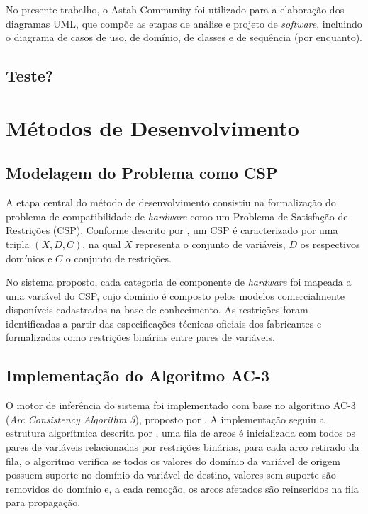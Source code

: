 No presente trabalho, o Astah Community foi utilizado para a elaboração dos diagramas UML, que compõe as etapas de análise
e projeto de \textit{software}, incluindo o diagrama de casos de uso, de domínio, de classes e de sequência (por enquanto).

\subsection{Teste?}

\section{Métodos de Desenvolvimento}

\subsection{Modelagem do Problema como CSP}
A etapa central do método de desenvolvimento consistiu na formalização do problema de compatibilidade de \textit{hardware}
como um Problema de Satisfação de Restrições (CSP). Conforme descrito por \textcite{Russell2010}, um CSP é caracterizado
por uma tripla $(X, D, C)$, na qual $X$ representa o conjunto de variáveis, $D$ os respectivos domínios e $C$ o conjunto
de restrições.

No sistema proposto, cada categoria de componente de \textit{hardware} foi mapeada a uma variável do CSP, cujo domínio é
composto pelos modelos comercialmente disponíveis cadastrados na base de conhecimento. As restrições foram identificadas a partir
das especificações técnicas oficiais dos fabricantes e formalizadas como restrições binárias entre pares de variáveis.

\subsection{Implementação do Algoritmo AC-3}
O motor de inferência do sistema foi implementado com base no algoritmo AC-3 (\textit{Arc Consistency Algorithm 3}),
proposto por \textcite{Mackworth1977}. A implementação seguiu a estrutura algorítmica descrita por \textcite{Russell2010},
uma fila de arcos é inicializada com todos os pares de variáveis relacionadas por restrições binárias, para cada arco retirado
da fila, o algoritmo verifica se todos os valores do domínio da variável de origem possuem suporte no domínio da variável de destino,
valores sem suporte são removidos do domínio e, a cada remoção, os arcos afetados são reinseridos na fila para propagação.

